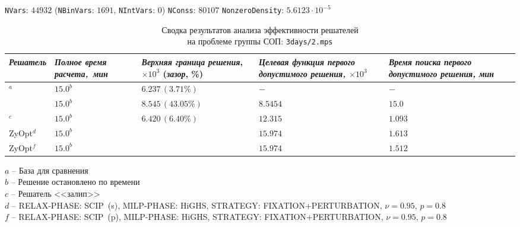 \documentclass[%
	11pt,
	a4paper,
	utf8,
		]{article}
\begin{document}
\vspace*{5mm}

{
	\begin{table}[!h]
		\centering
		\caption{Сводка результатов анализа эффективности решателей\\ на проблеме группы СОП: \texttt{3days/2.mps}} 
		
		{\footnotesize \texttt{NVars}: $ 44932 $ (\texttt{NBinVars}: $ 1691 $,  \texttt{NIntVars}: $ 0 $) \texttt{NConss}: $ 80107 $ \texttt{NonzeroDensity}: $ 5.6123 \cdot 10^{-5} $}\\[2mm]
		
		\begin{tabular}{ p{2.9cm} | p{2.5cm} p{3.8cm} p{3.75cm} p{3.6cm} p{3.2cm} }
			\rowcolor{black!5}\emph{Решатель} & \emph{Полное время \mbox{расчета, мин}} & \emph{Верхняя граница} \mbox{\itshape решения}, $ \times 10^{3} $ (\emph{зазор}, \%) & \emph{Целевая функция первого допустимого решения, $ \times 10^3 $} & \emph{Время поиска первого допустимого решения, мин} \\
			\hline
			\rowcolor{blue!3}{CPLEX 12.8.0.0}$ ^a $ & $ 15.0^b $ & $ 6.237 \, (3.71\%) $ & $ - $ & $ - $ \\
			\rowcolor{black!5}{SCIP 8.0.3} & $ 15.0^b $ & $ 8.545 \, (43.05\%) $ & $ 8.5454 $ & $ 15.0 $ \\
			\rowcolor{blue!3}{HiGHS 1.5.3}$ ^c $ & $ 15.0^b $ & $ 6.420 \, (6.40\%)$ & $ 12.315 $ & $ 1.093 $ \\
			\rowcolor{black!5}ZyOpt$^d $ & {$ 15.0^b $}  & \ccb{$ 8.002 \, (18.86\%) (-28.3\%) $} & $ 15.974 $ & $ 1.613 $ \\
			\rowcolor{blue!3}ZyOpt$^f $ & {$ 15.0^b $}  & \ccb{$ 8.002 \, (18.86\%) (-28.3\%) $} & $ 15.974 $ & $ 1.512 $ 
		\end{tabular}
	\end{table}
	\vspace*{-3mm}
	\hspace*{3mm}$ a $ -- {\footnotesize База для сравнения}\\[-7mm]
	
	\hspace*{3mm}$ b $ -- {\footnotesize Решение остановлено по времени}\\[-7mm]
	
	\hspace*{3mm}$ c $ -- {\footnotesize Решатель <<залип>>}\\[-7mm]
	
	\hspace*{3mm}$ d $ -- {\footnotesize RELAX-PHASE: SCIP~(s), MILP-PHASE: HiGHS, STRATEGY: FIXATION+PERTURBATION, $ \nu = 0.95 $, $ p = 0.8 $}\\[-7mm]
	
	\hspace*{3mm}$ f $ -- {\footnotesize RELAX-PHASE: SCIP~(p), MILP-PHASE: HiGHS, STRATEGY: FIXATION+PERTURBATION, $ \nu = 0.95 $, $ p = 0.8 $}\\[-7mm]
}
\end{document}
